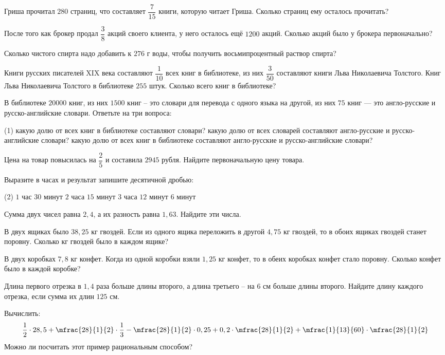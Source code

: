 %
%
\begin{class}[number=5]
	\begin{listofex}
		\item Гриша прочитал \(280\) страниц, что составляет \(\dfrac{7}{15}\) книги, которую читает Гриша. Сколько страниц ему осталось прочитать?
		\item После того как брокер продал \( \dfrac{3}{8} \) акций своего клиента, у него осталось ещё \(1200\) акций. Сколько акций было у брокера первоначально?
		\item Сколько чистого спирта надо добавить к \(276\) г воды, чтобы получить восьмипроцентный раствор спирта?
		\item Книги русских писателей XIX века составляют \(\dfrac{1}{10}\) всех книг в библиотеке, из них \(\dfrac{3}{50}\) составляют книги Льва Николаевича Толстого. Книг Льва Николаевича Толстого в библиотеке \(255\) штук. Сколько всего книг в библиотеке?
		\item В библиотеке \(20000\) книг, из них \(1500\) книг – это словари для перевода с одного языка на другой, из них \(75\) книг --- это англо-русские и русско-английские словари. Ответьте на три вопроса:
		\begin{tasks}(1)
			\task какую долю от всех книг в библиотеке составляют словари?
			\task какую долю от всех словарей составляют англо-русские и русско-английские словари?
			\task какую долю от всех книг в библиотеке составляют англо-русские и русско-английские словари?
		\end{tasks}
		\item Цена на товар повысилась на \(\dfrac{2}{5}\) и составила \(2945\) рубля. Найдите первоначальную цену товара.
		\item Выразите в часах и результат запишите десятичной дробью:
		\begin{tasks}(2)
			\task \(1\) час \(30\) минут
			\task \(2\) часа \(15\) минут
			\task \(3\) часа \(12\) минут
			\task \(6\) минут
		\end{tasks}
		\item Сумма двух чисел равна \(2,4\), а их разность равна \(1,63\). Найдите эти числа.
		\item В двух ящиках было \(38,25\) кг гвоздей. Если из одного ящика переложить в другой \(4,75\) кг гвоздей, то в обоих ящиках гвоздей станет поровну. Сколько кг гвоздей было в каждом ящике?
		\item В двух коробках \(7,8\) кг конфет. Когда из одной коробки взяли \(1,25\) кг конфет, то в обеих коробках конфет стало поровну. Сколько конфет было в каждой коробке?
		\item Длина первого отрезка в \(1,4\) раза больше длины второго, а длина третьего – на \(6\) см больше длины второго. Найдите длину каждого отрезка, если сумма их длин \(125\) см.
		\item Вычислить: 
		\[\dfrac{1}{2} \cdot 28,5 + \mfrac{28}{1}{2} \cdot \dfrac{1}{3} - \mfrac{28}{1}{2} \cdot 0,25 + 0,2 \cdot \mfrac{28}{1}{2} + \mfrac{1}{13}{60} \cdot \mfrac{28}{1}{2}\]
		Можно ли посчитать этот пример рациональным способом?
	\end{listofex}
\end{class}

